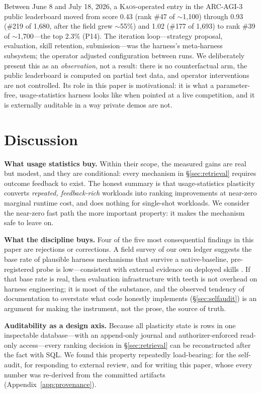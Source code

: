 \documentclass[11pt]{article}
\newcommand{\kaos}{\textsc{Kaos}}
\begin{document}
Between June 8 and July 18, 2026, a \kaos{}-operated entry in the ARC-AGI-3 public leaderboard moved from score 0.43 (rank \#47 of $\sim$1{,}100) through 0.93 (\#219 of 1{,}680, after the field grew $\sim$55\%) and 1.02 (\#177 of 1{,}693) to rank \#39 of $\sim$1{,}700---the top 2.3\% (P14). The iteration loop---strategy proposal, evaluation, skill retention, submission---was the harness's meta-harness subsystem; the operator adjusted configuration between runs. We deliberately present this as an \emph{observation}, not a result: there is no counterfactual arm, the public leaderboard is computed on partial test data, and operator interventions are not controlled. Its role in this paper is motivational: it is what a parameter-free, usage-statistics harness looks like when pointed at a live competition, and it is externally auditable in a way private demos are not.

\section{Discussion}

\textbf{What usage statistics buy.} Within their scope, the measured gains are real but modest, and they are conditional: every mechanism in \S\ref{sec:retrieval} requires outcome feedback to exist. The honest summary is that usage-statistics plasticity converts \emph{repeated, feedback-rich} workloads into ranking improvements at near-zero marginal runtime cost, and does nothing for single-shot workloads. We consider the near-zero fast path the more important property: it makes the mechanism safe to leave on.

\textbf{What the discipline buys.} Four of the five most consequential findings in this paper are rejections or corrections. A field survey of our own ledger suggests the base rate of plausible harness mechanisms that survive a native-baseline, pre-registered probe is low---consistent with external evidence on deployed skills \citep{sweskills2026}. If that base rate is real, then evaluation infrastructure with teeth is not overhead on harness engineering; it is most of the substance, and the observed tendency of documentation to overstate what code honestly implements (\S\ref{sec:selfaudit}) is an argument for making the instrument, not the prose, the source of truth.

\textbf{Auditability as a design axis.} Because all plasticity state is rows in one inspectable database---with an append-only journal and authorizer-enforced read-only access---every ranking decision in \S\ref{sec:retrieval} can be reconstructed after the fact with SQL. We found this property repeatedly load-bearing: for the self-audit, for responding to external review, and for writing this paper, whose every number was re-derived from the committed artifacts (Appendix~\ref{app:provenance}).
\end{document}
